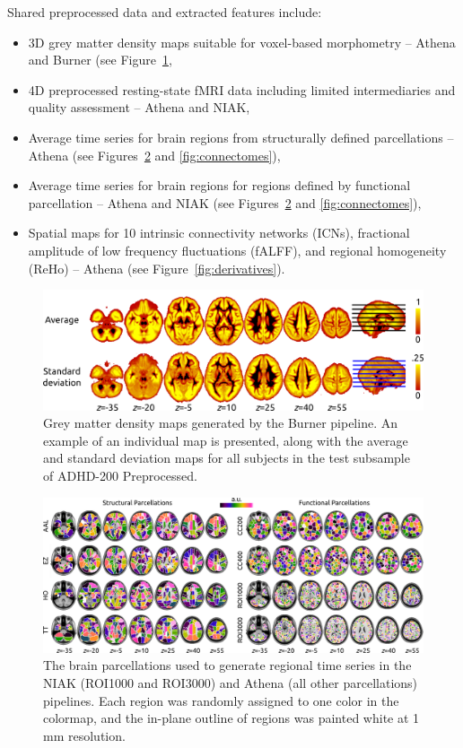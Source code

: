 \documentclass[preprint,12pt,3p]{elsarticle}
\providecommand{\tightlist}{%
  \setlength{\itemsep}{0pt}\setlength{\parskip}{0pt}}
\begin{document}
Shared preprocessed data and extracted features include:
\begin{itemize}
\tightlist
    \item 3D grey matter density maps suitable for voxel-based morphometry -- Athena and Burner (see Figure~\ref{fig:burner},
    \item 4D preprocessed resting-state fMRI data including limited intermediaries and quality assessment -- Athena and NIAK,
    \item Average time series for brain regions from structurally defined parcellations -- Athena (see Figures~\ref{fig:parcels} and \ref{fig:connectomes}),
    \item Average time series for brain regions for regions defined by functional parcellation -- Athena and NIAK (see Figures~\ref{fig:parcels} and \ref{fig:connectomes}),
    \item Spatial maps for 10 intrinsic connectivity networks (ICNs), fractional amplitude of low frequency fluctuations (fALFF), and regional homogeneity (ReHo) -- Athena (see Figure~\ref{fig:derivatives}).
\end{itemize}

\begin{figure}[!t]
\begin{center}
  \includegraphics[width=0.6\linewidth]{fig_burner}
  \caption{Grey matter density maps generated by the Burner pipeline. An example of an individual map is presented, along with the average and standard deviation maps for all subjects in the test subsample of ADHD-200 Preprocessed. }
  \label{fig:burner}
\end{center}
\end{figure}

\begin{figure}[!t]
\begin{center}
  \includegraphics[width=\linewidth]{fig_parcels}
  \caption{The brain parcellations used to generate regional time series in the NIAK (ROI1000 and ROI3000) and Athena (all other parcellations) pipelines. Each region was randomly assigned to one color in the colormap, and the in-plane outline of regions was painted white at 1 mm resolution.}
  \label{fig:parcels}
\end{center}
\end{figure}
\end{document}
